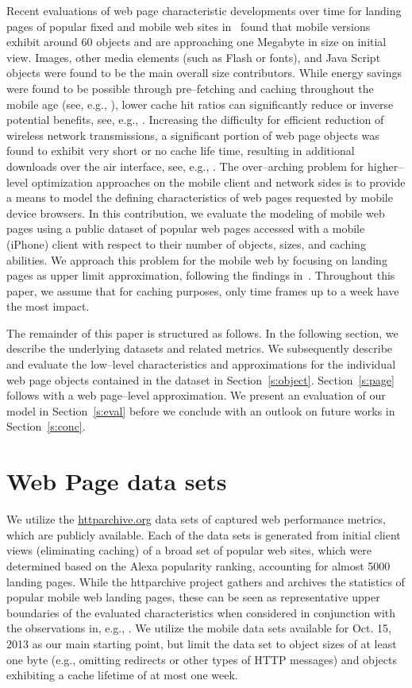 \documentclass[letterpaper,conference]{IEEEtran}
\begin{document}
Recent evaluations of web page characteristic developments over time for landing pages of popular fixed and mobile web sites in~\cite{JoSe14Commag} found that mobile versions exhibit around 60 objects and are approaching one Megabyte in size on initial view. 
Images, other media elements (such as Flash or fonts), and Java Script objects were found to be the main overall size contributors.
While energy savings were found to be possible through pre--fetching and caching throughout the mobile age (see, e.g., \cite{SaIs02, ShKuDaWa05,ThChWo13}),
lower cache hit ratios can significantly reduce or inverse potential benefits, see, e.g., \cite{Wang:2012ks,Marquez:2008wf}.
Increasing the difficulty for efficient reduction of wireless network transmissions, a significant portion of web page objects was found to exhibit very short or no cache life time, resulting in additional downloads over the air interface, see, e.g., \cite{JoSe14Commag,Qian:2014dw,JoSe14GreenComm}.
The over--arching problem for higher--level optimization approaches on the mobile client and network sides is to provide a means to model the defining characteristics of web pages requested by mobile device browsers. 
In this contribution, we evaluate the modeling of mobile web pages using a public dataset of popular web pages accessed with a mobile (iPhone) client with respect to their number of objects, sizes, and caching abilities.
We approach this problem for the mobile web by focusing on landing pages as upper limit approximation, following the findings in~\cite{BuMaSe13}.
Throughout this paper, we assume that for caching purposes, only time frames up to a week have the most impact.

The remainder of this paper is structured as follows.
In the following section, we describe the underlying datasets and related metrics. 
We subsequently describe and evaluate the low--level characteristics and approximations for the individual web page objects contained in the dataset in Section~\ref{s:object}.
Section~\ref{s:page} follows with a web page--level approximation.
We present an evaluation of our model in Section~\ref{s:eval} before we conclude with an outlook on future works in Section~\ref{s:conc}.


\section{Web Page data sets}
\label{s:data}
We utilize the \url{httparchive.org} data sets of captured web performance metrics, which are publicly available. 
Each of the data sets is generated from initial client views (eliminating caching) of a broad set of popular web sites, which were determined based on the Alexa popularity ranking, accounting for almost 5000 landing pages. 
While the httparchive project gathers and archives the statistics of popular mobile web landing pages, these can be seen as representative upper boundaries of the evaluated characteristics when considered in conjunction with the observations in, e.g.,  \cite{BuMaSe13}.
We utilize the mobile data sets available for Oct. 15, 2013 as our main starting point, but limit the data set to object sizes of at least one byte (e.g., omitting redirects or other types of HTTP messages) and objects exhibiting a cache lifetime of at most one week.
\end{document}
